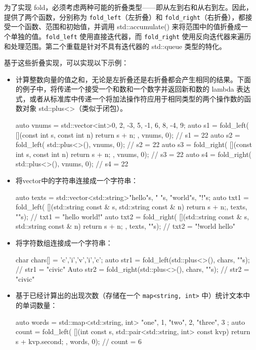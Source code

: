 为了实现 fold，必须考虑两种可能的折叠类型——即从左到右和从右到左。因此，提供了两个函数，分别称为 \verb|fold_left|（左折叠）和 \verb|fold_right|（右折叠），都接受一个函数、范围和初始值，并调用 std::accumulate() 来将范围中的值折叠成一个单独的值。\verb|fold_left| 使用直接迭代器，而 \verb|fold_right| 使用反向迭代器来遍历和处理范围。第二个重载是针对不具有迭代器的 std::queue 类型的特化。

基于这些折叠实现，可以实现以下示例：

\begin{itemize}
\item
计算整数向量的值之和，无论是左折叠还是右折叠都会产生相同的结果。下面的例子中，将传递一个接受一个和数和一个数字并返回新和数的 lambda 表达式，或者从标准库中传递一个将加法操作符应用于相同类型的两个操作数的函数对象 std::plus<>（类似于闭包）。

\begin{cpp}
auto vnums =
    std::vector<int>{0, 2, -3, 5, -1, 6, 8, -4, 9};
auto s1 = fold_left(
    [](const int s, const int n) {return s + n; },
    vnums, 0);                // s1 = 22
auto s2 = fold_left(
    std::plus<>(), vnums, 0); // s2 = 22
auto s3 = fold_right(
    [](const int s, const int n) {return s + n; },
    vnums, 0);                // s3 = 22
auto s4 = fold_right(
    std::plus<>(), vnums, 0); // s4 = 22
\end{cpp}

\item
将vector中的字符串连接成一个字符串：

\begin{cpp}
auto texts =
    std::vector<std::string>{"hello"s, " "s, "world"s, "!"s};
auto txt1 = fold_left(
    [](std::string const & s, std::string const & n) {
        return s + n;},
    texts, ""s);    // txt1 = "hello world!"
auto txt2 = fold_right(
    [](std::string const & s, std::string const & n) {
        return s + n; },
    texts, ""s);    // txt2 = "!world hello"
\end{cpp}

\item
将字符数组连接成一个字符串：

\begin{cpp}
char chars[] = {'c','i','v','i','c'};
auto str1 = fold_left(std::plus<>(), chars, ""s);
// str1 = "civic"
Auto str2 = fold_right(std::plus<>(), chars, ""s);
// str2 = "civic"
\end{cpp}

\item
基于已经计算出的出现次数（存储在一个 \verb|map<string, int>| 中）统计文本中的单词数量：

\begin{cpp}
auto words = std::map<std::string, int>{
    {"one", 1}, {"two", 2}, {"three", 3} };
auto count = fold_left(
    [](int const s, std::pair<std::string, int> const kvp) {
        return s + kvp.second; },
    words, 0); // count = 6
\end{cpp}
\end{itemize}

